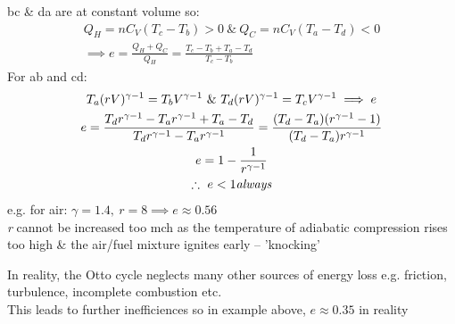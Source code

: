 \documentclass[a4paper, 11pt, normalem]{report}
\begin{document}
bc \& da are at constant volume so:
\begin{gather*}
	Q_{H} = nC_{V}(T_{c} - T_{b}) > 0 ~\&~ Q_{C} = nC_{V}(T_{a} - T_{d}) < 0 \\
	\implies e = \frac{Q_{H} + Q_{C}}{Q_{H}} = \frac{T_{c} - T_{b} + T_{a} - T_{d}}{T_{c} - T_{b}}
\end{gather*}
For ab and cd:
\begin{gather*}
	T_{a}(rV)^{\gamma - 1} = T_{b}V^{\gamma - 1} ~\&~ T_{d}(rV)^{\gamma - 1} = T_{c}V^{\gamma - 1} \implies e \\
	e = \frac{T_{d}r^{\gamma - 1} - T_{a}r^{\gamma - 1} + T_{a} - T_{d}}{T_{d}r^{\gamma - 1} - T_{a}r^{\gamma - 1}} = \frac{(T_{d} - T_{a})(r^{\gamma - 1} - 1)}{(T_{d} - T_{a})r^{\gamma - 1}} \\
	e = 1 - \frac{1}{r^{\gamma - 1}} \\
	\therefore ~ e < 1 \emph{always}
\end{gather*}
e.g. for air: $\gamma = 1.4, ~ r = 8 \implies e \approx 0.56$ \\
\emph{r} cannot be increased too mch as the temperature of adiabatic compression rises too high \& the air/fuel mixture ignites early -- 'knocking'

In reality, the Otto cycle neglects many other sources of energy loss e.g. friction, turbulence, incomplete combustion etc. \\
This leads to further inefficiences so in example above, $e \approx 0.35$ in reality
\end{document}
